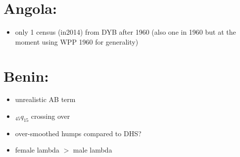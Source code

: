 \documentclass[12pt,a4paper]{article}
\begin{document}
\section*{Angola:}
\begin{itemize}
\item only 1 census (in2014) from DYB after 1960 (also one in 1960 but at the moment using WPP 1960 for generality)
\end{itemize}

\section*{Benin:}
\begin{itemize}
\item unrealistic AB term
\item $_{45}q_{15}$ crossing over 
\item over-smoothed humps compared to DHS?
\item female lambda $>$ male lambda
\end{itemize}
\end{document}

